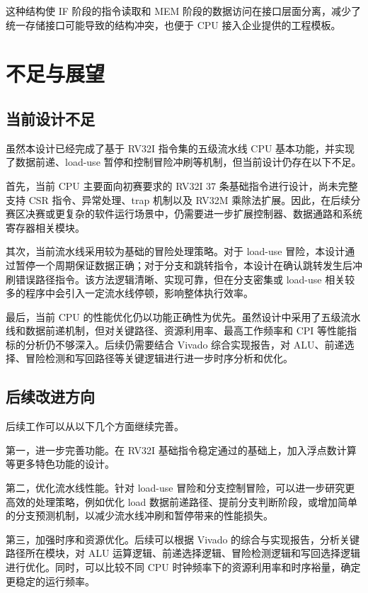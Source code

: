 \documentclass[UTF8,a4paper,12pt]{ctexart}
\begin{document}
这种结构使 IF 阶段的指令读取和 MEM 阶段的数据访问在接口层面分离，减少了统一存储接口可能导致的结构冲突，也便于 CPU 接入企业提供的工程模板。

\section{不足与展望}

\subsection{当前设计不足}

虽然本设计已经完成了基于 RV32I 指令集的五级流水线 CPU 基本功能，并实现了数据前递、load-use 暂停和控制冒险冲刷等机制，但当前设计仍存在以下不足。

首先，当前 CPU 主要面向初赛要求的 RV32I 37 条基础指令进行设计，尚未完整支持 CSR 指令、异常处理、trap 机制以及 RV32M 乘除法扩展。因此，在后续分赛区决赛或更复杂的软件运行场景中，仍需要进一步扩展控制器、数据通路和系统寄存器相关模块。

其次，当前流水线采用较为基础的冒险处理策略。对于 load-use 冒险，本设计通过暂停一个周期保证数据正确；对于分支和跳转指令，本设计在确认跳转发生后冲刷错误路径指令。该方法逻辑清晰、实现可靠，但在分支密集或 load-use 相关较多的程序中会引入一定流水线停顿，影响整体执行效率。

最后，当前 CPU 的性能优化仍以功能正确性为优先。虽然设计中采用了五级流水线和数据前递机制，但对关键路径、资源利用率、最高工作频率和 CPI 等性能指标的分析仍不够深入。后续仍需要结合 Vivado 综合实现报告，对 ALU、前递选择、冒险检测和写回路径等关键逻辑进行进一步时序分析和优化。

\subsection{后续改进方向}

后续工作可以从以下几个方面继续完善。

第一，进一步完善功能。在 RV32I 基础指令稳定通过的基础上，加入浮点数计算等更多特色功能的设计。

第二，优化流水线性能。针对 load-use 冒险和分支控制冒险，可以进一步研究更高效的处理策略，例如优化 load 数据前递路径、提前分支判断阶段，或增加简单的分支预测机制，以减少流水线冲刷和暂停带来的性能损失。

第三，加强时序和资源优化。后续可以根据 Vivado 的综合与实现报告，分析关键路径所在模块，对 ALU 运算逻辑、前递选择逻辑、冒险检测逻辑和写回选择逻辑进行优化。同时，可以比较不同 CPU 时钟频率下的资源利用率和时序裕量，确定更稳定的运行频率。
\end{document}
